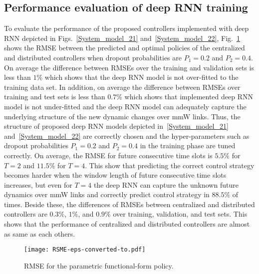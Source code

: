 \documentclass[conference]{IEEEtran}
\begin{document}
\subsection{Performance evaluation of deep RNN training}
To evaluate the performance of the proposed controllers implemented with deep RNN depicted in Figs.~\ref{System_model_21} and~\ref{System_model_22}, Fig.~\ref{RMSE} shows the RMSE between the predicted and optimal policies of the centralized and distributed controllers when dropout probabilities are $P_{1}=0.2$ and $P_{2}=0.4$. On average the difference between RMSEs over the training and validation sets is less than $1\%$ which shows that the deep RNN model is not over-fitted to the training data set. In addition, on average the difference between RMSEs over training and test sets is less than $0.7\%$ which shows that implemented deep RNN model is not under-fitted and the deep RNN model can adequately capture the underlying structure of the new dynamic changes over mmW links. Thus, the structure of proposed deep RNN models depicted in~\ref{System_model_21} and~\ref{System_model_22} are correctly chosen and the hyper-parameters such as dropout probabilities $P_{1}=0.2$ and $P_{2}=0.4$ in the training phase are tuned correctly. On average, the RMSE for future consecutive time slots is $5.5\%$ for $T=2$ and $11.5\%$ for $T=4$. This show that predicting the correct control strategy becomes harder when the window length of future consecutive time slots increases, but even for $T=4$ the deep RNN can capture the unknown future dynamics over mmW links and correctly predict control strategy in $88.5\%$ of times. Beside these, the differences of RMSEs between centralized and distributed controllers are $0.3\%$, $1\%$, and $0.9\%$ over training, validation, and test sets. This shows that the performance of centralized and distributed controllers are almost as same as each others.
\begin{figure}[t!]
  \centering
  \texttt{[image: RSME-eps-converted-to.pdf]}
  \vspace{-0.1cm}
  \caption{RMSE for the parametric functional-form policy.}
  \vspace{-0.5cm}
  \label{RMSE}
\end{figure}
\end{document}
